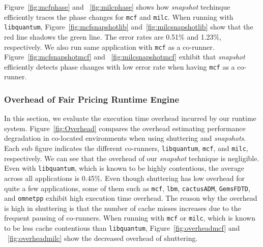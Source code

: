 \documentclass{sig-alternate}
\begin{document}
Figure~\ref{fig:mcfphase} and  ~\ref{fig:milcphase} shows how \textit{snapshot} techinque efficiently traces the phase changes for \texttt{mcf} and \texttt{milc}. When running with \texttt{libquantum}, Figure~\ref{fig:mcfsnapshotlib} and~\ref{fig:milcsnapshotlib} show that the red line shadows the green line. The error rates are 0.51\% and 1.23\%, respectively. We also run same application with \texttt{mcf} as a co-runner. Figure~\ref{fig:mcfsnapshotmcf} and ~\ref{fig:milcsnapshotmcf} exhibit that \textit{snapshot} efficiently detects phase changes with low error rate when having \texttt{mcf} as a co-runner.
\subsubsection{Overhead of Fair Pricing Runtime Engine}
\label{subsubsec:OverheadofFairPricingRuntimeEngine}

In this section, we evaluate the execution time overhead incurred by our runtime system. Figure~\ref{fig:Overhead} compares the overhead estimating performance degradation in co-located environments when using shuttering and \textit{snapshots}. Each sub figure indicates the different co-runners, \texttt{libquantum}, \texttt{mcf}, and \texttt{milc}, respectively. We can see that the overhead of our \textit{snapshot} technique is negligible. Even with \texttt{libquantum}, which is known to be highly contentious, the average across all applications is 0.45\%. Even though shuttering has low overhead for quite a few applications, some of them such as \texttt{mcf}, \texttt{lbm}, \texttt{cactusADM}, \texttt{GemsFDTD}, and \texttt{omnetpp} exhibit high execution time overhead. The reason why the overhead is high in shuttering is that the number of cache misses increases due to the frequent pausing of co-runners. When running with \texttt{mcf} or \texttt{milc}, which is known to be less cache contentious than \texttt{libquantum}, Figure~\ref{fig:overheadmcf} and ~\ref{fig:overheadmilc} show the decreased overhead of shuttering.
\end{document}
